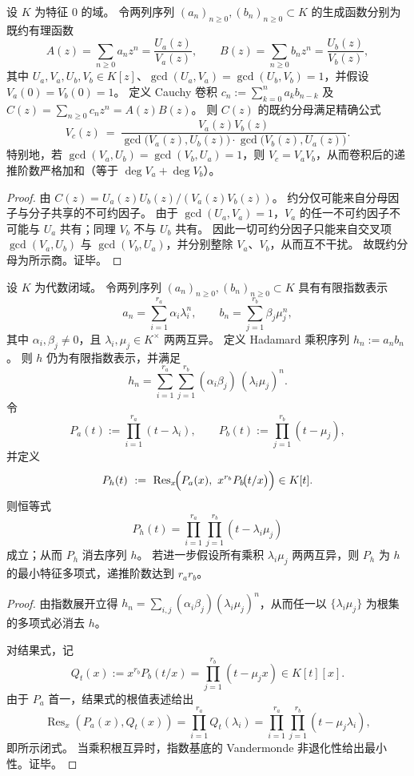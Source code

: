 \begin{theorem}\label{thm:xi-cauchy-convolution-denominator-gcd-law}
设 \(K\) 为特征 \(0\) 的域。
令两列序列 \((a_n)_{n\ge 0},(b_n)_{n\ge 0}\subset K\) 的生成函数分别为既约有理函数
\[
A(z)=\sum_{n\ge 0}a_n z^n=\frac{U_a(z)}{V_a(z)},\qquad
B(z)=\sum_{n\ge 0}b_n z^n=\frac{U_b(z)}{V_b(z)},
\]
其中 \(U_a,V_a,U_b,V_b\in K[z]\)、\(\gcd(U_a,V_a)=\gcd(U_b,V_b)=1\)，并假设 \(V_a(0)=V_b(0)=1\)。
定义 Cauchy 卷积 \(c_n:=\sum_{k=0}^n a_k b_{n-k}\) 及 \(C(z)=\sum_{n\ge 0}c_n z^n=A(z)B(z)\)。
则 \(C(z)\) 的既约分母满足精确公式
\[
V_c(z)\ =\ \frac{V_a(z)V_b(z)}{\gcd\!\bigl(V_a(z),U_b(z)\bigr)\cdot \gcd\!\bigl(V_b(z),U_a(z)\bigr)}.
\]
特别地，若 \(\gcd(V_a,U_b)=\gcd(V_b,U_a)=1\)，则 \(V_c=V_aV_b\)，从而卷积后的递推阶数严格加和（等于 \(\deg V_a+\deg V_b\)）。
\end{theorem}
\begin{proof}
由 \(C(z)=U_a(z)U_b(z)/(V_a(z)V_b(z))\)。
约分仅可能来自分母因子与分子共享的不可约因子。
由于 \(\gcd(U_a,V_a)=1\)，\(V_a\) 的任一不可约因子不可能与 \(U_a\) 共有；同理 \(V_b\) 不与 \(U_b\) 共有。
因此一切可约分因子只能来自交叉项 \(\gcd(V_a,U_b)\) 与 \(\gcd(V_b,U_a)\)，并分别整除 \(V_a\)、\(V_b\)，从而互不干扰。
故既约分母为所示商。证毕。
\end{proof}

\begin{theorem}\label{thm:xi-hadamard-product-resultant-multiplicative-convolution}
设 \(K\) 为代数闭域。
令两列序列 \((a_n)_{n\ge 0},(b_n)_{n\ge 0}\subset K\) 具有有限指数表示
\[
a_n=\sum_{i=1}^{r_a}\alpha_i\lambda_i^{n},\qquad
b_n=\sum_{j=1}^{r_b}\beta_j\mu_j^{n},
\]
其中 \(\alpha_i,\beta_j\neq 0\)，且 \(\lambda_i,\mu_j\in K^\times\) 两两互异。
定义 Hadamard 乘积序列 \(h_n:=a_n b_n\)。
则 \(h\) 仍为有限指数表示，并满足
\[
h_n=\sum_{i=1}^{r_a}\sum_{j=1}^{r_b}(\alpha_i\beta_j)\,(\lambda_i\mu_j)^{n}.
\]
令
\[
P_a(t):=\prod_{i=1}^{r_a}(t-\lambda_i),\qquad
P_b(t):=\prod_{j=1}^{r_b}(t-\mu_j),
\]
并定义
\[
P_h(t)\ :=\ \operatorname{Res}_{x}\!\Bigl(P_a(x),\ x^{r_b}P_b\!\bigl(t/x\bigr)\Bigr)\in K[t].
\]
则恒等式
\[
P_h(t)=\prod_{i=1}^{r_a}\prod_{j=1}^{r_b}(t-\lambda_i\mu_j)
\]
成立；从而 \(P_h\) 消去序列 \(h\)。
若进一步假设所有乘积 \(\lambda_i\mu_j\) 两两互异，则 \(P_h\) 为 \(h\) 的最小特征多项式，递推阶数达到 \(r_ar_b\)。
\end{theorem}
\begin{proof}
由指数展开立得
\(
h_n=\sum_{i,j}(\alpha_i\beta_j)(\lambda_i\mu_j)^n
\)，从而任一以 \(\{\lambda_i\mu_j\}\) 为根集的多项式必消去 \(h\)。
\par
对结果式，记
\[
Q_t(x):=x^{r_b}P_b(t/x)=\prod_{j=1}^{r_b}(t-\mu_j x)\in K[t][x].
\]
由于 \(P_a\) 首一，结果式的根值表述给出
\[
\operatorname{Res}_x(P_a(x),Q_t(x))=\prod_{i=1}^{r_a}Q_t(\lambda_i)
=\prod_{i=1}^{r_a}\prod_{j=1}^{r_b}(t-\mu_j\lambda_i),
\]
即所示闭式。
当乘积根互异时，指数基底的 Vandermonde 非退化性给出最小性。证毕。
\end{proof}

